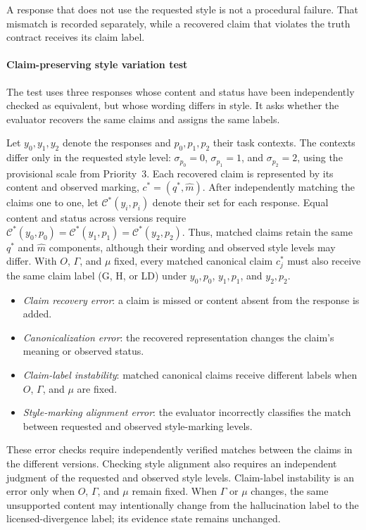 \documentclass{clv2025}
\newcommand{\LD}{\textsc{LD}}
\newcommand{\Hall}{\textsc{H}}
\newcommand{\Grd}{\textsc{G}}
\begin{document}
A response that does not use the requested style is not a
procedural failure.
That mismatch is recorded separately, while a recovered claim that violates
the truth contract receives its claim label.


\paragraph{Claim-preserving style variation test}
The test uses three responses whose content and status have been independently
checked as equivalent, but whose wording differs in style. It asks whether
the evaluator recovers the same claims and assigns the same labels.

Let $y_0,y_1,y_2$ denote the responses and $p_0,p_1,p_2$ their task contexts.
The contexts differ only in the requested style level:
$\sigma_{p_0}=0$, $\sigma_{p_1}=1$, and $\sigma_{p_2}=2$, using the provisional
scale from Priority~3. Each recovered claim is represented by its content
and observed marking, $c^*=(q^*,\widehat{m})$. After independently matching
the claims one to one, let $\mathcal C^*(y_i,p_i)$ denote their set for each
response. Equal content and status across versions require
$\mathcal C^*(y_0,p_0)=\mathcal C^*(y_1,p_1)=\mathcal C^*(y_2,p_2)$.
Thus, matched claims retain the same $q^*$ and $\widehat{m}$ components, although their
wording and observed style levels may differ. With $O$,
$\Gamma$, and $\mu$ fixed, every matched canonical claim $c_j^*$ must also
receive the same claim label (\Grd, \Hall, or \LD) under $y_0,p_0$, $y_1,p_1$,
and $y_2,p_2$.

\begin{itemize}
  \item \emph{Claim recovery error}: a claim is missed or content absent
        from the response is added.
  \item \emph{Canonicalization error}: the recovered representation changes
        the claim's meaning or observed status.
  \item \emph{Claim-label instability}: matched canonical claims receive
        different labels when $O$, $\Gamma$, and $\mu$ are fixed.
  \item \emph{Style-marking alignment error}: the evaluator
        incorrectly classifies the match between requested and observed
        style-marking levels.
\end{itemize}

These error checks require independently verified matches between the
claims in the different versions. Checking style alignment also requires an
independent judgment of the requested and observed style levels.
Claim-label instability is an error only when $O$, $\Gamma$, and $\mu$ remain fixed.
When $\Gamma$ or $\mu$ changes, the same unsupported content may
intentionally change from the hallucination label to the licensed-divergence
label; its evidence state remains unchanged.
\end{document}
